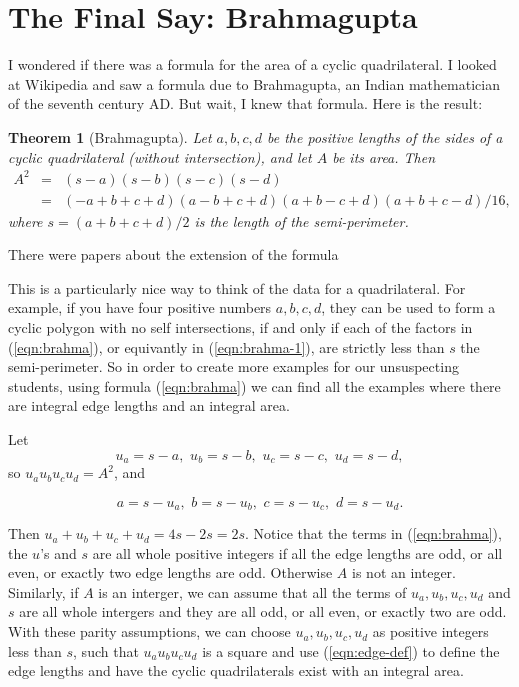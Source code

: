 \documentclass[11pt]{article}
\newtheorem{theorem}{Theorem}[section]
\numberwithin{equation}{section}
\numberwithin{figure}{section}
\begin{document}
    \section{The Final Say: Brahmagupta} \label{section:Brahmagupta}
   
    I wondered if there was a formula for the area of a cyclic quadrilateral.  I looked at Wikipedia and saw a formula due to Brahmagupta, an Indian mathematician of the seventh century
 AD.  But wait, I knew that formula.    Here is the result:
 \begin{theorem}[Brahmagupta]\label{thm:brahma}Let $a,b,c,d$ be the positive lengths of the sides of a cyclic quadrilateral (without intersection), and let $A$ be its area.  Then
 \begin{eqnarray}A^2&=&(s-a)(s-b)(s-c)(s-d) \label{eqn:brahma}\\
 				&=&(-a+b+c+d)(a-b+c+d)(a+b-c+d)(a+b+c-d)/16,\label{eqn:brahma-1}
 \end{eqnarray}
 where $s=(a+b+c+d)/2$ is the length of the semi-perimeter.
 \end{theorem}
 
There were papers about the extension of the formula   \cite{Connelly-Brahma, Robbins-Monthly, Robbins-DCG}
 
This is a particularly nice way to think of the data for a quadrilateral.  For example, if you have four positive numbers $a,b,c,d$, they can be used to form a cyclic polygon with no self intersections, if and only if each of the factors in (\ref{eqn:brahma}), or equivantly in (\ref{eqn:brahma-1}), are strictly less than $s$ the semi-perimeter.  So in order to create more examples for our unsuspecting students, using formula (\ref{eqn:brahma}) we can find all the examples where there are integral edge lengths and an integral area.  

Let 
\[u_a=s-a, \, \, u_b=s-b, \, \,  u_c=s-c, \, \,  u_d=s-d,\]
 so $u_au_bu_cu_d=A^2$, and  
 
 \begin{equation}a=s-u_a, \, \,  b=s-u_b, \, \, c=s-u_c, \, \, d=s-u_d.\label{eqn:edge-def}  \end{equation}
 
 Then 
$u_a + u_b + u_c + u_d = 4s -2s=2s.$
 Notice that the terms in (\ref{eqn:brahma}), the $u$'s and $s$ are all whole positive integers if all the edge lengths are odd, or all even, or exactly two edge lengths are odd.  Otherwise $A$ is not an integer.  Similarly, if $A$ is an interger, we can assume that all the terms of $u_a, u_b, u_c, u_d$ and $s$ are all whole intergers and they are all odd, or all even, or exactly two are odd.  With these parity assumptions, we can choose $u_a, u_b, u_c, u_d$ as positive integers less than $s$, such that $u_au_bu_cu_d$ is a square and use (\ref{eqn:edge-def}) 
 to define the edge lengths and have the cyclic quadrilaterals exist with an integral area. 
 
\end{document}
